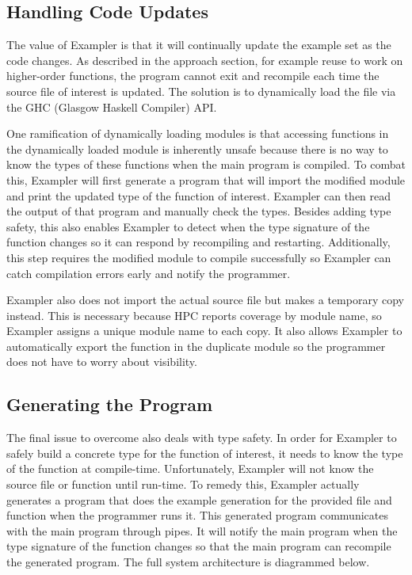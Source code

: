 \subsection{Handling Code Updates}

The value of Exampler is that it will continually update the example set as the code changes.
As described in the approach section, for example reuse to work on higher-order functions, the program cannot exit and recompile each time the source file of interest is updated.
The solution is to dynamically load the file via the GHC (Glasgow Haskell Compiler) API.

One ramification of dynamically loading modules is that accessing functions in the dynamically loaded module is inherently unsafe because there is no way to know the types of these functions when the main program is compiled.
To combat this, Exampler will first generate a program that will import the modified module and print the updated type of the function of interest.
Exampler can then read the output of that program and manually check the types.
Besides adding type safety, this also enables Exampler to detect when the type signature of the function changes so it can respond by recompiling and restarting.
Additionally, this step requires the modified module to compile successfully so Exampler can catch compilation errors early and notify the programmer.

Exampler also does not import the actual source file but makes a temporary copy instead.
This is necessary because HPC reports coverage by module name, so Exampler assigns a unique module name to each copy.
It also allows Exampler to automatically export the function in the duplicate module so the programmer does not have to worry about visibility.

\subsection{Generating the Program}

The final issue to overcome also deals with type safety.
In order for Exampler to safely build a concrete type for the function of interest, it needs to know the type of the function at compile-time.
Unfortunately, Exampler will not know the source file or function until run-time.
To remedy this, Exampler actually generates a program that does the example generation for the provided file and function when the programmer runs it.
This generated program communicates with the main program through pipes.
It will notify the main program when the type signature of the function changes so that the main program can recompile the generated program.
The full system architecture is diagrammed below.
